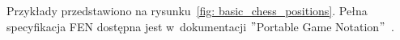 Przykłady przedstawiono na rysunku~\ref{fig: basic_chess_positions}.
%
%
%
Pełna specyfikacja FEN dostępna jest w~dokumentacji \("\)Portable Game Notation\("\)~\cite*{PGNdoc}.

